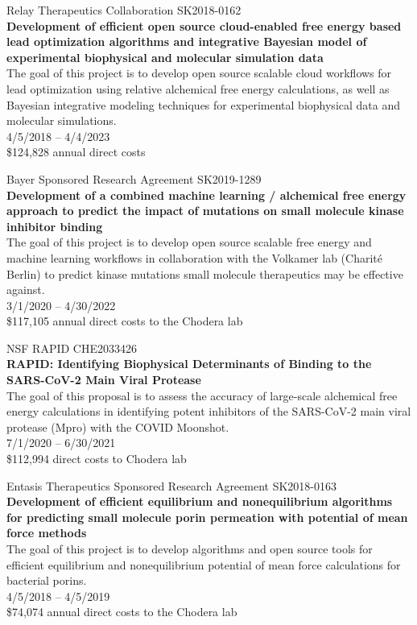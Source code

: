\documentclass[10pt]{article}
\begin{document}
\vspace{1.5ex}

Relay Therapeutics Collaboration SK2018-0162\\
{\bf Development of efficient open source cloud-enabled free energy based lead optimization algorithms and integrative Bayesian model of experimental biophysical and molecular simulation data} \\
The goal of this project is to develop open source scalable cloud workflows for lead optimization using relative alchemical free energy calculations, as well as Bayesian integrative modeling techniques for experimental biophysical data and molecular simulations. \\
4/5/2018 -- 4/4/2023 \\
\$124,828 annual direct costs

\vspace{1.5ex}

Bayer Sponsored Research Agreement SK2019-1289 \\
{\bf Development of a combined machine learning / alchemical free energy approach to predict the impact of mutations on small molecule kinase inhibitor binding} \\
The goal of this project is to develop open source scalable free energy and machine learning workflows in collaboration with the Volkamer lab (Charit\'{e} Berlin) to predict kinase mutations small molecule therapeutics may be effective against. \\
3/1/2020 -- 4/30/2022 \\
\$117,105 annual direct costs to the Chodera lab

\vspace{1.5ex}

NSF RAPID CHE2033426\\
{\bf RAPID: Identifying Biophysical Determinants of Binding to the SARS-CoV-2 Main Viral Protease}\\
The goal of this proposal is to assess the accuracy of large-scale alchemical free energy calculations in identifying potent inhibitors of the SARS-CoV-2 main viral protease (Mpro) with the COVID Moonshot. \\
7/1/2020 -- 6/30/2021\\
\$112,994 direct costs to Chodera lab

\vspace{1.5ex}

Entasis Therapeutics Sponsored Research Agreement SK2018-0163 \\
{\bf Development of efficient equilibrium and nonequilibrium algorithms for predicting small molecule porin permeation with potential of mean force methods} \\
The goal of this project is to develop algorithms and open source tools for efficient equilibrium and nonequilibrium potential of mean force calculations for bacterial porins.\\
4/5/2018 -- 4/5/2019 \\
\$74,074 annual direct costs to the Chodera lab
\end{document}
